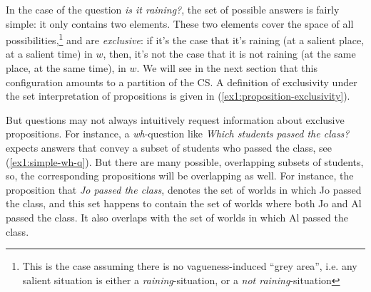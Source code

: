 In the case of the question \textit{is it raining?}, the set of possible answers is fairly simple: it only contains two elements. These two elements  cover the space of all possibilities,\footnote{This is the case assuming there is no vagueness-induced ``grey area'', i.e. any salient situation is either a \textit{raining}-situation, or a \textit{not raining}-situation} and are \textit{exclusive}: if it's the case that it's raining (at a salient place, at a salient time) in $w$, then, it's not the case that it is not raining (at the same place, at the same time), in $w$. We will see in the next section that this configuration amounts to a partition of the CS. A definition of exclusivity under the set interpretation of propositions is given in (\ref{ex1:proposition-exclusivity}).

\begin{exe}
	\label{ex1:proposition-exclusivity}
\end{exe}


But questions may not always intuitively request information about exclusive propositions. For instance, a \textit{wh}-question like \textit{Which students passed the class?} expects answers that convey a subset of students who passed the class, see (\ref{ex1:simple-wh-q}). But there are many possible, overlapping subsets of students, so, the corresponding propositions will be overlapping as well. For instance, the proposition that \textit{Jo passed the class}, denotes the set of worlds in which Jo passed the class, and this set happens to contain the set of worlds where both Jo and Al passed the class. It also overlaps with the set of worlds in which Al passed the class. 

\begin{exe}
	\label{ex1:simple-wh-q}
\end{exe} 

